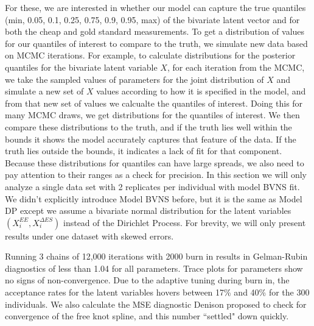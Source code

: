 \documentclass[11pt]{article}\usepackage[]{graphicx}\usepackage[]{color}
\begin{document}
For these, we are interested in whether our model can capture the true quantiles (min, 0.05, 0.1, 0.25, 0.75, 0.9, 0.95, max) of the bivariate latent vector and for both the cheap and gold standard measurements. To get a distribution of values for our quantiles of interest to compare to the truth, we simulate new data based on MCMC iterations. For example, to calculate distributions for the posterior quantiles for the bivariate latent variable $X$, for each iteration from the MCMC, we  take the sampled values of parameters for the joint distribution of $X$ and simulate a new set of $X$ values according to how it is specified in the model, and from that new set of values we calcualte the quantiles of interest. Doing this for many MCMC draws, we get distributions for the quantiles of interest. We then compare these distributions to the truth, and if the truth lies well within the bounds it shows the model accurately captures that feature of the data. If the truth lies outside the bounds, it indicates a lack of fit for that component. Because these distributions for quantiles can have large spreads, we also need to pay attention to their ranges as a check for precision. In this section we will only analyze a single data set with 2 replicates per individual with model BVNS fit. We didn't explicitly introduce Model BVNS before, but it is the same as Model DP except we assume a bivariate normal distribution for the latent variables $(X_i^{EE},X_i^{\Delta ES})$ instead of the Dirichlet Process. For brevity, we will only present results under one dataset with skewed errors. 

Running 3 chains of 12,000 iterations with 2000 burn in results in Gelman-Rubin diagnostics of less than 1.04 for all parameters. Trace plots for parameters show no signs of non-convergence. Due to the adaptive tuning during burn in, the acceptance rates for the latent variables hovers between 17\% and 40\% for the 300 individuals. We also calculate the MSE diagnostic Denison proposed to check for convergence of the free knot spline, and this number ``settled" down quickly. 
\end{document}
